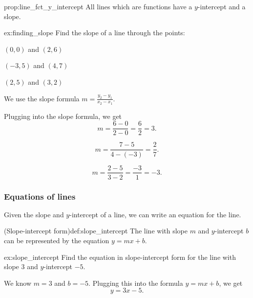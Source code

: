 \documentclass{article}
\begin{document}
\begin{prop}{}{prop:line_fct_y_intercept}
    All lines which are functions have a $y$-intercept and a slope.
\end{prop}

\begin{example}{}{ex:finding_slope}
    Find the slope of a line through the points:
    \begin{problem}
        \item $(0,0)$ and $(2,6)$
        \item $(-3,5)$ and $(4,7)$
        \item $(2,5)$ and $(3,2)$
    \end{problem}
\end{example}
\begin{solution}
    We use the slope formula $m=\frac{y_2-y_1}{x_2-x_1}$.
    \begin{problem}
        \item Plugging into the slope formula, we get \[m=\frac{6-0}{2-0}=\frac{6}{2}=3.\] 
        \item \[m=\frac{7-5}{4-(-3)}=\frac{2}{7}.\]
        \item \[m=\frac{2-5}{3-2}=\frac{-3}{1}=-3.\]
    \end{problem}
\end{solution}

\subsubsection{Equations of lines}

Given the slope and $y$-intercept of a line, we can write an equation for the line.
\begin{definition}{(Slope-intercept form)}{def:slope_intercept}
    The line with slope $m$ and $y$-intercept $b$ can be represented by the equation $y=mx+b$.
\end{definition}

\begin{example}{}{ex:slope_intercept}
    Find the equation in slope-intercept form for the line with slope $3$ and $y$-intercept $-5$.
\end{example}
\begin{solution}
    We know $m=3$ and $b=-5$. Plugging this into the formula $y=mx+b$, we get \[y=3x-5.\]
\end{solution}
\end{document}
